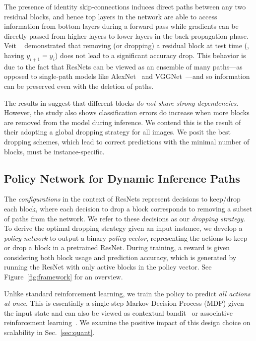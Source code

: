 \documentclass[10pt,twocolumn,letterpaper]{article}
\begin{document}
The presence of identity skip-connections induces direct paths between any two residual blocks, and hence top layers in the network are able to access information from bottom layers during a forward pass while gradients can be directly passed from higher layers to lower layers in the back-propagation phase. Veit \etal~\cite{veit2016residual} demonstrated that removing (or dropping) a residual block at test time (\ie, having $y_{i+1} = y_i$) does not lead to a significant accuracy drop. %
This behavior is due to the fact that ResNets can be viewed as an ensemble of many paths---as opposed to single-path models like AlexNet~\cite{krizhevsky2012imagenet} and VGGNet~\cite{simonyan2014very}---and so information can be preserved even with the deletion of paths. 

The results in \cite{veit2016residual} suggest that different blocks {\em do not share strong dependencies}. However, the study also shows classification errors do increase when more blocks are removed from the model during inference.  We contend this is the result of their adopting a global dropping strategy  for all images.  We posit the best dropping schemes, which lead to correct predictions with the minimal number of blocks, must be instance-specific.

\subsection{Policy Network for Dynamic Inference Paths}\label{sec:pn}

The \emph{configurations} in the context of ResNets represent decisions to keep/drop each block, where each decision to drop a block corresponds to removing a subset of paths from the network. We refer to these decisions as our \emph{dropping strategy}.  
To derive the optimal dropping strategy given an input instance, we develop a {\em policy network} to output a binary {\em policy vector}, representing the actions to keep or drop a block in a pretrained ResNet. During training, a reward is given considering both block usage and prediction accuracy, which is generated by running the ResNet with only active blocks in the policy vector.   See Figure~\ref{fig:framework} for an overview.

Unlike standard reinforcement learning, we train the policy to predict \emph{all actions at once}.  This is essentially a single-step Markov Decision Process (MDP) given the input state and can also be viewed as contextual bandit~\cite{langford2008epoch} or associative reinforcement learning~\cite{sutton1998reinforcement}.  %
We examine the positive impact of this design choice on scalability in Sec.~\ref{sec:quant}.
\end{document}
